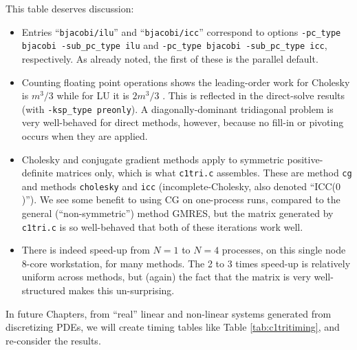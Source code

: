 This table deserves discussion:
\begin{itemize}
\item Entries ``\texttt{bjacobi/ilu}'' and ``\texttt{bjacobi/icc}'' correspond to options \texttt{-pc\_type bjacobi -sub\_pc\_type ilu} and \texttt{-pc\_type bjacobi -sub\_pc\_type icc}, respectively.  As already noted, the first of these is the parallel default.
\item Counting floating point operations shows the leading-order work for Cholesky is $m^3/3$ while for LU it is $2 m^3/3$ \citep{TrefethenBau}.  This is reflected in the direct-solve results (with \texttt{-ksp\_type preonly}).  A diagonally-dominant tridiagonal problem is very well-behaved for direct methods, however, because no fill-in or pivoting occurs when they are applied.
\item Cholesky and conjugate gradient methods apply to symmetric positive-definite matrices only, which is what \texttt{c1tri.c} assembles.  These are \pKSP method \texttt{cg} and \pPC methods \texttt{cholesky} and \texttt{icc} (incomplete-Cholesky, also denoted ``ICC($0$)'').  We see some benefit to using CG on one-process runs, compared to the general (``non-symmetric'') method GMRES, but the matrix generated by \texttt{c1tri.c} is so well-behaved that both of these iterations work well.
\item There is indeed speed-up from $N=1$ to $N=4$ processes, on this single node 8-core workstation, for many methods.  The 2 to 3 times speed-up is relatively uniform across methods, but (again) the fact that the matrix is very well-structured makes this un-surprising.
\end{itemize}

In future Chapters, from ``real'' linear and non-linear systems generated from discretizing PDEs, we will create timing tables like Table \ref{tab:c1tritiming}, and re-consider the results.

